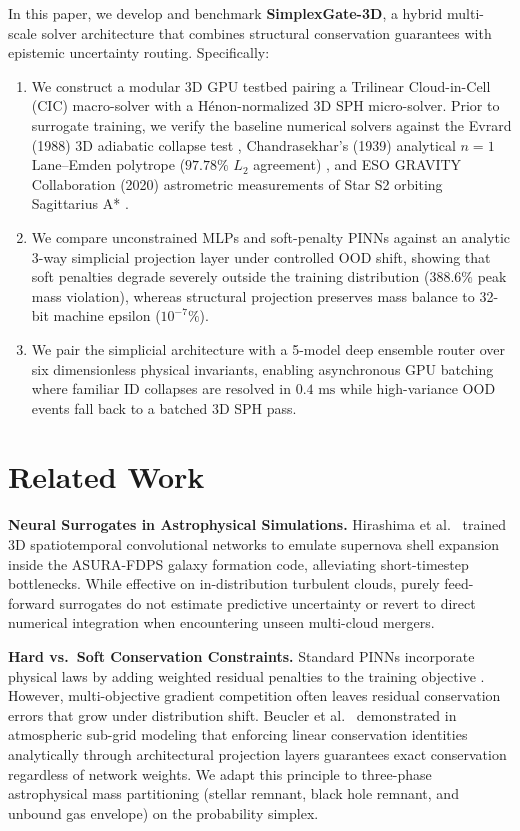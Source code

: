 \documentclass[10pt,twocolumn,letterpaper]{article}
\begin{document}
In this paper, we develop and benchmark \textbf{SimplexGate-3D}, a hybrid multi-scale solver architecture that combines structural conservation guarantees with epistemic uncertainty routing. Specifically:
\begin{enumerate}
    \item We construct a modular 3D GPU testbed pairing a Trilinear Cloud-in-Cell (CIC) macro-solver with a H\'{e}non-normalized 3D SPH micro-solver. Prior to surrogate training, we verify the baseline numerical solvers against the Evrard (1988) 3D adiabatic collapse test \cite{evrard1988}, Chandrasekhar's (1939) analytical $n=1$ Lane--Emden polytrope ($97.78\%$ $L_2$ agreement) \cite{chandrasekhar1939}, and ESO GRAVITY Collaboration (2020) astrometric measurements of Star S2 orbiting Sagittarius A* \cite{gravity2020}.
    \item We compare unconstrained MLPs and soft-penalty PINNs against an analytic 3-way simplicial projection layer under controlled OOD shift, showing that soft penalties degrade severely outside the training distribution ($388.6\%$ peak mass violation), whereas structural projection preserves mass balance to 32-bit machine epsilon ($10^{-7}\%$).
    \item We pair the simplicial architecture with a 5-model deep ensemble router over six dimensionless physical invariants, enabling asynchronous GPU batching where familiar ID collapses are resolved in $0.4\text{ ms}$ while high-variance OOD events fall back to a batched 3D SPH pass.
\end{enumerate}

\section{Related Work}

\textbf{Neural Surrogates in Astrophysical Simulations.} Hirashima et al.\ \cite{hirashima2023} trained 3D spatiotemporal convolutional networks to emulate supernova shell expansion inside the ASURA-FDPS galaxy formation code, alleviating short-timestep bottlenecks. While effective on in-distribution turbulent clouds, purely feed-forward surrogates do not estimate predictive uncertainty or revert to direct numerical integration when encountering unseen multi-cloud mergers.

\textbf{Hard vs.\ Soft Conservation Constraints.} Standard PINNs incorporate physical laws by adding weighted residual penalties to the training objective \cite{raissi2019}. However, multi-objective gradient competition often leaves residual conservation errors that grow under distribution shift. Beucler et al.\ \cite{beucler2021} demonstrated in atmospheric sub-grid modeling that enforcing linear conservation identities analytically through architectural projection layers guarantees exact conservation regardless of network weights. We adapt this principle to three-phase astrophysical mass partitioning (stellar remnant, black hole remnant, and unbound gas envelope) on the probability simplex.
\end{document}
